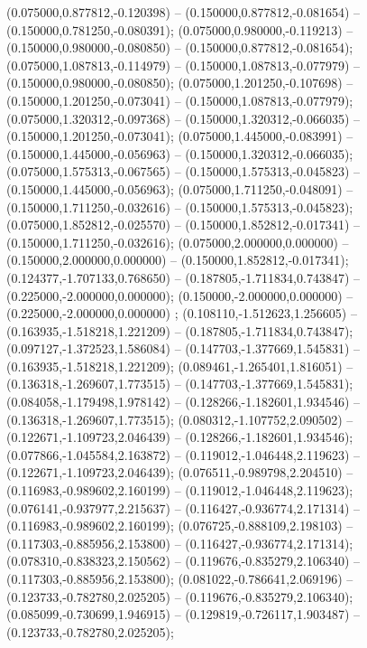  (0.075000,0.877812,-0.120398) -- (0.150000,0.877812,-0.081654) -- (0.150000,0.781250,-0.080391);
 (0.075000,0.980000,-0.119213) -- (0.150000,0.980000,-0.080850) -- (0.150000,0.877812,-0.081654);
 (0.075000,1.087813,-0.114979) -- (0.150000,1.087813,-0.077979) -- (0.150000,0.980000,-0.080850);
 (0.075000,1.201250,-0.107698) -- (0.150000,1.201250,-0.073041) -- (0.150000,1.087813,-0.077979);
 (0.075000,1.320312,-0.097368) -- (0.150000,1.320312,-0.066035) -- (0.150000,1.201250,-0.073041);
 (0.075000,1.445000,-0.083991) -- (0.150000,1.445000,-0.056963) -- (0.150000,1.320312,-0.066035);
 (0.075000,1.575313,-0.067565) -- (0.150000,1.575313,-0.045823) -- (0.150000,1.445000,-0.056963);
 (0.075000,1.711250,-0.048091) -- (0.150000,1.711250,-0.032616) -- (0.150000,1.575313,-0.045823);
 (0.075000,1.852812,-0.025570) -- (0.150000,1.852812,-0.017341) -- (0.150000,1.711250,-0.032616);
 (0.075000,2.000000,0.000000) -- (0.150000,2.000000,0.000000) -- (0.150000,1.852812,-0.017341);
 (0.124377,-1.707133,0.768650) -- (0.187805,-1.711834,0.743847) -- (0.225000,-2.000000,0.000000);
 (0.150000,-2.000000,0.000000) -- (0.225000,-2.000000,0.000000) ;
 (0.108110,-1.512623,1.256605) -- (0.163935,-1.518218,1.221209) -- (0.187805,-1.711834,0.743847);
 (0.097127,-1.372523,1.586084) -- (0.147703,-1.377669,1.545831) -- (0.163935,-1.518218,1.221209);
 (0.089461,-1.265401,1.816051) -- (0.136318,-1.269607,1.773515) -- (0.147703,-1.377669,1.545831);
 (0.084058,-1.179498,1.978142) -- (0.128266,-1.182601,1.934546) -- (0.136318,-1.269607,1.773515);
 (0.080312,-1.107752,2.090502) -- (0.122671,-1.109723,2.046439) -- (0.128266,-1.182601,1.934546);
 (0.077866,-1.045584,2.163872) -- (0.119012,-1.046448,2.119623) -- (0.122671,-1.109723,2.046439);
 (0.076511,-0.989798,2.204510) -- (0.116983,-0.989602,2.160199) -- (0.119012,-1.046448,2.119623);
 (0.076141,-0.937977,2.215637) -- (0.116427,-0.936774,2.171314) -- (0.116983,-0.989602,2.160199);
 (0.076725,-0.888109,2.198103) -- (0.117303,-0.885956,2.153800) -- (0.116427,-0.936774,2.171314);
 (0.078310,-0.838323,2.150562) -- (0.119676,-0.835279,2.106340) -- (0.117303,-0.885956,2.153800);
 (0.081022,-0.786641,2.069196) -- (0.123733,-0.782780,2.025205) -- (0.119676,-0.835279,2.106340);
 (0.085099,-0.730699,1.946915) -- (0.129819,-0.726117,1.903487) -- (0.123733,-0.782780,2.025205);
